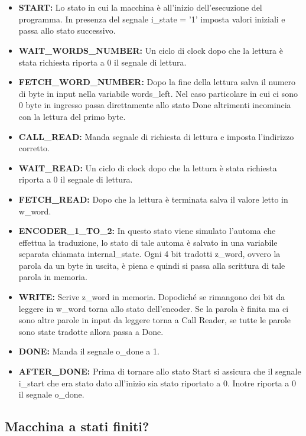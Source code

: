 \documentclass{article}
\begin{document}
\\
\\
\begin{itemize}
	\item \textbf{START:} Lo stato in cui la macchina è all'inizio dell'esecuzione del programma. In presenza del segnale i\_state = '1' imposta valori iniziali e passa allo stato successivo.
	\item \textbf{WAIT\_WORDS\_NUMBER:} Un ciclo di clock dopo che la lettura è stata richiesta riporta a 0 il segnale di lettura.
	\item \textbf{FETCH\_WORD\_NUMBER:} Dopo la fine della lettura salva il numero di byte in input nella variabile words\_left. Nel caso particolare in cui ci sono 0 byte in ingresso passa direttamente allo stato Done altrimenti incomincia con la lettura del primo byte.
	\item \textbf{CALL\_READ:} Manda segnale di richiesta di lettura e imposta l'indirizzo corretto.
	\item \textbf{WAIT\_READ:} Un ciclo di clock dopo che la lettura è stata richiesta riporta a 0 il segnale di lettura.
	\item \textbf{FETCH\_READ:} Dopo che la lettura è terminata salva il valore letto in w\_word.
	\item \textbf{ENCODER\_1\_TO\_2:} In questo stato viene simulato l'automa che effettua la traduzione, lo stato di tale automa è salvato in una variabile separata chiamata internal\_state. Ogni 4 bit tradotti z\_word, ovvero la parola da un byte in uscita, è piena e quindi si passa alla scrittura di tale parola in memoria.
	\item \textbf{WRITE:} Scrive z\_word in memoria. Dopodiché se rimangono dei bit da leggere in w\_word torna allo stato dell'encoder. Se la parola è finita ma ci sono altre parole in input da leggere torna a Call Reader, se tutte le parole sono state tradotte allora passa a Done.
	\item \textbf{DONE:} Manda il segnale o\_done a 1.
	\item \textbf{AFTER\_DONE:} Prima di tornare allo stato Start si assicura che il segnale i\_start che era stato dato all'inizio sia stato riportato a 0. Inotre riporta a 0 il segnale o\_done.
\end{itemize}



\subsection{Macchina a stati finiti?}
\end{document}
